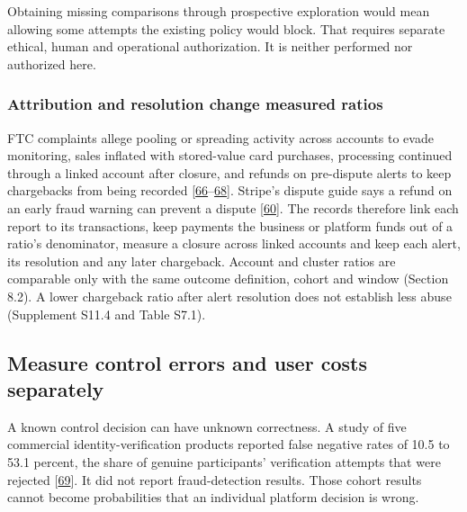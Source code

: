 \documentclass[acmlarge,nonacm]{acmart}
\begin{document}
Obtaining missing comparisons through prospective exploration would mean
allowing some attempts the existing policy would block. That requires
separate ethical, human and operational authorization. It is neither
performed nor authorized here.

\hypertarget{attribution-and-resolution-change-measured-ratios}{%
\subsubsection*{Attribution and resolution change measured
ratios}\label{attribution-and-resolution-change-measured-ratios}}

FTC complaints allege pooling or spreading activity across accounts to
evade monitoring, sales inflated with stored-value card purchases,
processing continued through a linked account after closure, and refunds
on pre-dispute alerts to keep chargebacks from being recorded
{[}\protect\hyperlink{ref-FTC2020FirstData}{66}--\protect\hyperlink{ref-FTC2025Paddle}{68}{]}.
Stripe's dispute guide says a refund on an early fraud warning can
prevent a dispute {[}\protect\hyperlink{ref-Stripe2026Disputes}{60}{]}.
The records therefore link each report to its transactions, keep
payments the business or platform funds out of a ratio's denominator,
measure a closure across linked accounts and keep each alert, its
resolution and any later chargeback. Account and cluster ratios are
comparable only with the same outcome definition, cohort and window
(Section 8.2). A lower chargeback ratio after alert resolution does not
establish less abuse (Supplement S11.4 and Table S7.1).

\hypertarget{measure-control-errors-and-user-costs-separately}{%
\subsection{Measure control errors and user costs
separately}\label{measure-control-errors-and-user-costs-separately}}

A known control decision can have unknown correctness. A study of five
commercial identity-verification products reported false negative rates
of 10.5 to 53.1 percent, the share of genuine participants' verification
attempts that were rejected
{[}\protect\hyperlink{ref-Fatima2024}{69}{]}. It did not report
fraud-detection results. Those cohort results cannot become
probabilities that an individual platform decision is wrong.
\end{document}
